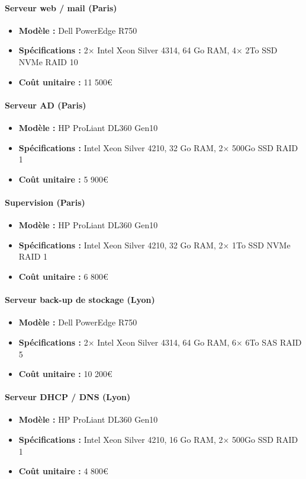 \documentclass{report}
\begin{document}
\paragraph{Serveur web / mail (Paris)}
\begin{itemize}
    \item \textbf{Modèle :} Dell PowerEdge R750
    \item \textbf{Spécifications :} 2× Intel Xeon Silver 4314, 64 Go RAM, 4× 2To SSD NVMe RAID 10
    \item \textbf{Coût unitaire :} 11 500€
\end{itemize}
\paragraph{Serveur AD (Paris)}
\begin{itemize}
    \item \textbf{Modèle :} HP ProLiant DL360 Gen10
    \item \textbf{Spécifications :} Intel Xeon Silver 4210, 32 Go RAM, 2× 500Go SSD RAID 1
    \item \textbf{Coût unitaire :} 5 900€
\end{itemize}
\paragraph{Supervision (Paris)}
\begin{itemize}
    \item \textbf{Modèle :} HP ProLiant DL360 Gen10
    \item \textbf{Spécifications :} Intel Xeon Silver 4210, 32 Go RAM, 2× 1To SSD NVMe RAID 1
    \item \textbf{Coût unitaire :} 6 800€
\end{itemize}
\paragraph{Serveur back-up de stockage (Lyon)}
\begin{itemize}
    \item \textbf{Modèle :} Dell PowerEdge R750
    \item \textbf{Spécifications :} 2× Intel Xeon Silver 4314, 64 Go RAM, 6× 6To SAS RAID 5
    \item \textbf{Coût unitaire :} 10 200€
\end{itemize}
\paragraph{Serveur DHCP / DNS (Lyon)}
\begin{itemize}
    \item \textbf{Modèle :} HP ProLiant DL360 Gen10
    \item \textbf{Spécifications :} Intel Xeon Silver 4210, 16 Go RAM, 2× 500Go SSD RAID 1
    \item \textbf{Coût unitaire :} 4 800€
\end{itemize}
\end{document}
